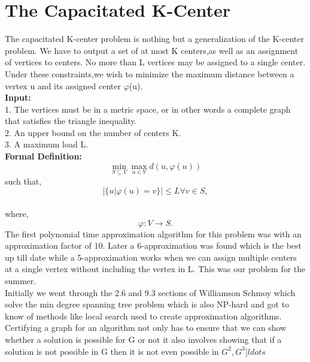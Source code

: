 \documentclass[12pt,a4paper,onecolumn]{article}
\begin{document}
\section{The Capacitated K-Center}
The capacitated K-center problem is nothing but a generalization of the K-center problem. We have to
output a set of at most K centers,as well as an assignment of vertices to centers. No more than L vertices may be assigned to a single center. Under these constraints,we
wish to minimize the maximum distance between a vertex u and its assigned center
$\varphi$(u). \\
\textbf{Input:}\\1. The vertices must be in a metric space, or in other words a complete graph that satisfies the triangle inequality.\\2. An
upper bound on the number of centers K.\\3. A maximum load L.\\\textbf{Formal Definition:}\\
$$ \min_{S \subseteq V}\max_{u \in V}d(u,\varphi(u)) $$such that,   $$|\{u|\varphi(u) = v\}|\leq L \forall v \in S,$$\\where,   $$\varphi : V \rightarrow S.$$
The first polynomial time approximation
algorithm for this problem was with an approximation factor of 10. Later a 6-approximation was found which is the best up till date while a 5-approximation works when we can assign multiple centers at a single vertex without including the vertex in L. This was our problem for the summer.
\\Initially we went through the 2.6 and 9.3 sections of Williamson Schmoy which solve the min degree spanning tree problem which is also NP-hard and got to know of methods like local search used to create approximation algorithms.\\Certifying a graph for an algorithm not only has to ensure that we can show whether a solution is possible for G or not it also involves showing that if a solution is not possible in G then it is not even possible in $G^2,G^3]ldots$
\end{document}
